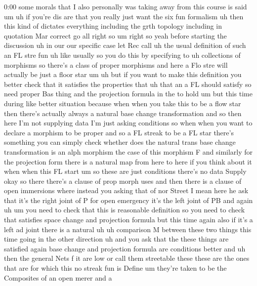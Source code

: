 \begin{unfinished}{0:00}
some  morals  that  I  also  personally  was
taking  away  from  this  course  is  said
um  uh  if  you're  dis  are  that  you  really
just  want  the  six  fun
formalism  uh  then  this  kind  of  dictates
everything  including  the  grth
topology
including  in  quotation  Mar  correct
go
all  right
so
um  right  so  yeah  before  starting  the
discussion
uh  in  our  our  specific
case  let  Rec  call  uh  the  usual
definition  of  such  an  FL  stre
fun
uh  like
usually  so  you  do  this  by  specifying  to
uh  collections  of  morphisms  so  there's  a
class
of  proper
morphisms  and  here  a  Flo  stre  will
actually  be  just  a  floor
star
um  uh  but  if  you  want  to  make  this
definition  you  better  check  that  it
satisfies  the  properties  that  uh  that  an
a  FL  should  satisfy
so  need  proper  Bas
thing  and  the  projection  formula  in
the  to  hold  um  but  this  time  during  like
better  situation
because  when  when  you  take  this  to  be  a
flow  star  then  there's  actually  always  a
natural  base  change
transformation  and  so  then  here  I'm  not
supplying  data  I'm  just  asking
conditions  so  when  when  you  want  to
declare  a  morphism  to  be  proper  and  so  a
FL  streak  to  be  a  FL  star  there's
something  you  can  simply  check  whether
does  the  natural  trans  base  change
transformation  is  an  alph  morphism  the
case  of  this  morphism  F  and  similarly
for  the  projection  form
there  is  a  natural  map  from  here  to  here
if  you  think  about  it  when  when  this  FL
start  um  so  these  are  just
conditions  there's  no  data
Supply  okay  so  there  there's  a  clause  of
prop  morph  uses  and  then  there  is  a
clause  of
open
immersions  where  instead  you  asking  that
of  nor  Street  I  mean  here  he  ask  that
it's  the  right  joint  of  P  for  open
emergency  it's  the  left  joint  of
PB
and  again
uh  um  you  need  to  check  that  this  is
reasonable  definition  so  you  need  to
check  that  satisfies  space  change  and
projection  formula  but  this  time  again
also  if  it's  a  left  ad  joint  there  is  a
natural  uh  uh  comparison  M  between  these
two  things  this  time  going  in  the  other
direction  uh  and  you  ask  that  the  these
things  are
satisfied  again  base  change  and
projection  formula  are  conditions
better
and
uh  then  the  general
Nets  f  it  are  low
or  call  them
streetable  these  these  are  the  ones  that
are  for  which  this  no  streak  fun  is
Define
um  they're  taken  to  be  the
Composites  of  an  open
merer  and  a

\end{unfinished}
